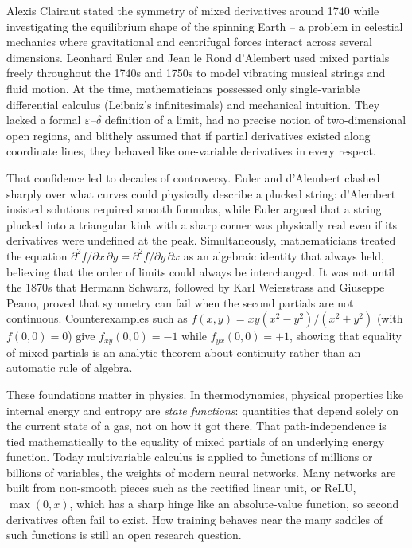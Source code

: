 \begin{historybox}
Alexis Clairaut stated the symmetry of mixed derivatives around 1740 while investigating the
equilibrium shape of the spinning Earth -- a problem in celestial mechanics where gravitational
and centrifugal forces interact across several dimensions. Leonhard Euler and Jean le Rond
d'Alembert used mixed partials freely throughout the 1740s and 1750s to model vibrating musical
strings and fluid motion. At the time, mathematicians possessed only single-variable
differential calculus (Leibniz's infinitesimals) and mechanical intuition. They lacked a formal
$\varepsilon$--$\delta$ definition of a limit, had no precise notion of two-dimensional open regions,
and blithely assumed that if partial derivatives existed along coordinate lines, they behaved
like one-variable derivatives in every respect.

That confidence led to decades of controversy. Euler and d'Alembert clashed sharply over what
curves could physically describe a plucked string: d'Alembert insisted solutions required smooth
formulas, while Euler argued that a string plucked into a triangular kink with a sharp corner
was physically real even if its derivatives were undefined at the peak. Simultaneously,
mathematicians treated the equation
$\partial^2 f/\partial x\,\partial y = \partial^2 f/\partial y\,\partial x$
as an algebraic identity that always held, believing that the order of limits could always be
interchanged. It was not until the 1870s that Hermann Schwarz, followed by Karl Weierstrass and
Giuseppe Peano, proved that symmetry can fail when the second partials are not
continuous. Counterexamples such as $f(x,y)=xy(x^2-y^2)/(x^2+y^2)$ (with $f(0,0)=0$) give
$f_{xy}(0,0)=-1$ while $f_{yx}(0,0)=+1$, showing that equality of mixed partials is an
analytic theorem about continuity rather than an automatic rule of algebra.

These foundations matter in physics.
In thermodynamics, physical properties like internal energy and entropy are \emph{state functions}:
quantities that depend solely on the current state of a gas, not on how it got there. That
path-independence is tied mathematically to the equality of mixed partials of an underlying
energy function. Today multivariable calculus is applied to functions of millions or billions
of variables, the weights of modern neural networks. Many networks are built from
non-smooth pieces such as the rectified linear unit, or ReLU, $\max(0,x)$, which has a sharp
hinge like an absolute-value function, so second derivatives often fail to exist.
How training behaves near the many saddles of such functions is still an open research
question.
\end{historybox}

